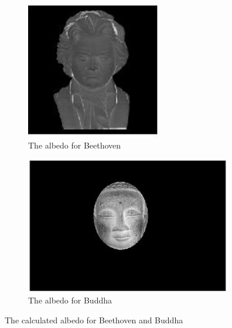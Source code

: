 \documentclass[12pt,a4paper,oneside,final]{article}
\begin{document}
\begin{figure}[H]
	\centering
	\begin{subfigure}{.5\textwidth}
		\centering
		\includegraphics[height=6cm]{BeethovenAlbedo}
		\caption{The albedo for Beethoven}
	\end{subfigure}%
	\begin{subfigure}{.5\textwidth}
		\centering
		\includegraphics[height=6cm]{BuddhaAlbedo}
		\caption{The albedo for Buddha}
	\end{subfigure}
	\caption{The calculated albedo for Beethoven and Buddha}
	\label{fig:albedo}
\end{figure}
\end{document}
